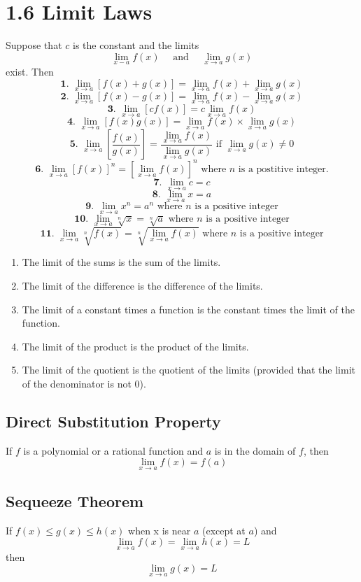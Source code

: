 %
%

\section*{1.6 Limit Laws}

Suppose that \(c\) is the constant and the limits 
$$\lim_{x-a}f(x) \quad \text{ and } \quad \lim_{x \to a}g(x)$$
exist. Then
$$\textbf{1. }\lim_{x \to a}[f(x)+g(x)]=\lim_{x \to a}f(x) + \lim_{x \to a}g(x)$$
$$\textbf{2. }\lim_{x \to a}[f(x)-g(x)]=\lim_{x \to a}f(x) - \lim_{x \to a}g(x)$$
$$\textbf{3. }\lim_{x \to a}[cf(x)]=c\lim_{x \to a}f(x)$$
$$\textbf{4. }\lim_{x \to a}[f(x)g(x)]=\lim_{x \to a}f(x) \times \lim_{x \to a}g(x)$$
$$\textbf{5. }\lim_{x \to a}[\frac{f(x)}{g(x)}]=\frac{\lim_{x \to a}f(x)}{\lim_{x \to a}g(x)} \text{ if } \lim_{x \to a}g(x) \neq 0 $$
$$\textbf{6. }\lim_{x \to a}{[f(x)]}^n={[\lim_{x \to a}f(x)]}^n \text{ where } n \text{ is a postitive integer.}$$
$$\textbf{7. }\lim_{x \to a}c=c$$
$$\textbf{8. }\lim_{x \to a}x=a$$
$$\textbf{9. }\lim_{x \to a}x^n=a^n \text{ where } n \text{ is a positive integer}$$
$$\textbf{10. }\lim_{x \to a}\sqrt[n]x=\sqrt[n]a \text{ where } n \text{ is a positive integer}$$
$$\textbf{11. }\lim_{x \to a}\sqrt[n]{f(x)}=\sqrt[n]{\lim_{x \to a}f(x)} \text{ where } n \text{ is a positive integer}$$

\begin{enumerate}
    \item The limit of the sums is the sum of the limits.
    \item The limit of the difference is the difference of the limits.
    \item The limit of a constant times a function is the constant times the limit of the function.
    \item The limit of the product is the product of the limits.
    \item The limit of the quotient is the quotient of the limits (provided that the limit of the denominator is not 0).
\end{enumerate}

\subsection*{Direct Substitution Property}

If \(f\) is a polynomial or a rational function and \(a\) is in the domain of \(f\), then 
$$\lim_{x \to a}f(x)=f(a)$$

\subsection*{Sequeeze Theorem}

If \(f(x) \leq g(x) \leq h(x)\) when x is near \(a\) (except at \(a\)) and 
$$\lim_{x \to a}f(x)=\lim_{x \to a}h(x) = L$$
then
$$\lim_{x \to a}g(x) = L$$
